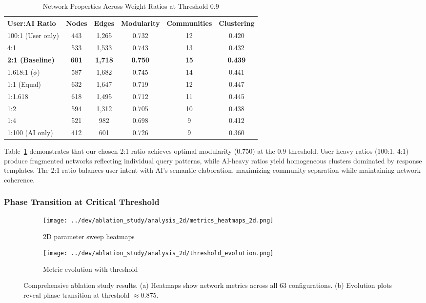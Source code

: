 \begin{table}[h]
\centering
\caption{Network Properties Across Weight Ratios at Threshold 0.9}
\label{tab:weight_ablation}
\begin{tabular}{lccccc}
\toprule
\textbf{User:AI Ratio} & \textbf{Nodes} & \textbf{Edges} & \textbf{Modularity} & \textbf{Communities} & \textbf{Clustering} \\
\midrule
100:1 (User only) & 443 & 1,265 & 0.732 & 12 & 0.420 \\
4:1 & 533 & 1,533 & 0.743 & 13 & 0.432 \\
\textbf{2:1 (Baseline)} & \textbf{601} & \textbf{1,718} & \textbf{0.750} & \textbf{15} & \textbf{0.439} \\
1.618:1 ($\phi$) & 587 & 1,682 & 0.745 & 14 & 0.441 \\
1:1 (Equal) & 632 & 1,647 & 0.719 & 12 & 0.447 \\
1:1.618 & 618 & 1,495 & 0.712 & 11 & 0.445 \\
1:2 & 594 & 1,312 & 0.705 & 10 & 0.438 \\
1:4 & 521 & 982 & 0.698 & 9 & 0.412 \\
1:100 (AI only) & 412 & 601 & 0.726 & 9 & 0.360 \\
\bottomrule
\end{tabular}
\end{table}

Table~\ref{tab:weight_ablation} demonstrates that our chosen 2:1 ratio achieves optimal modularity (0.750) at the 0.9 threshold. User-heavy ratios (100:1, 4:1) produce fragmented networks reflecting individual query patterns, while AI-heavy ratios yield homogeneous clusters dominated by response templates. The 2:1 ratio balances user intent with AI's semantic elaboration, maximizing community separation while maintaining network coherence.

\subsubsection{Phase Transition at Critical Threshold}

\begin{figure}[h]
\centering
\begin{subfigure}{0.48\textwidth}
    \centering
    \texttt{[image: ../dev/ablation\_study/analysis\_2d/metrics\_heatmaps\_2d.png]}
    \caption{2D parameter sweep heatmaps}
    \label{fig:ablation_heatmap}
\end{subfigure}
\hfill
\begin{subfigure}{0.48\textwidth}
    \centering
    \texttt{[image: ../dev/ablation\_study/analysis\_2d/threshold\_evolution.png]}
    \caption{Metric evolution with threshold}
    \label{fig:threshold_evolution}
\end{subfigure}
\caption{Comprehensive ablation study results. (a) Heatmaps show network metrics across all 63 configurations. (b) Evolution plots reveal phase transition at threshold $\approx$0.875.}
\label{fig:ablation_complete}
\end{figure}

